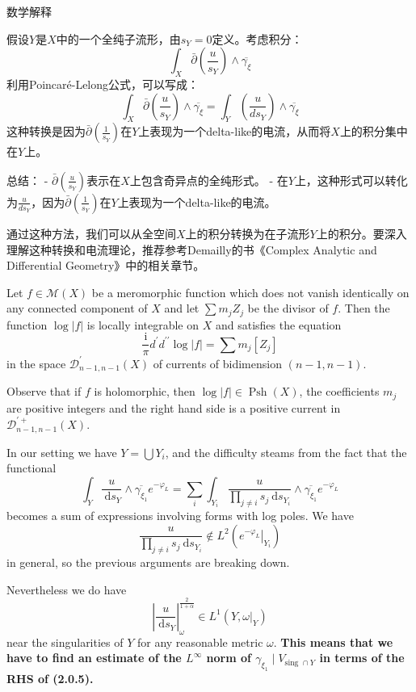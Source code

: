 \begin{remark}
数学解释

假设$Y$是$X$中的一个全纯子流形，由$s_Y=0$定义。考虑积分：
$$
\int_X \bar{\partial} \left( \frac{u}{s_Y} \right) \wedge \overline{\gamma_{\xi}}
$$
利用Poincaré-Lelong公式，可以写成：
$$
\int_X \bar{\partial} \left( \frac{u}{s_Y} \right) \wedge \overline{\gamma_{\xi}} = \int_Y \left( \frac{u}{ds_Y} \right) \wedge \overline{\gamma_{\xi}}
$$
这种转换是因为$\bar{\partial} \left( \frac{1}{s_Y} \right)$在$Y$上表现为一个delta-like的电流，从而将$X$上的积分集中在$Y$上。

总结：
- $\bar{\partial}\left(\frac{u}{s_Y}\right)$表示在$X$上包含奇异点的全纯形式。
- 在$Y$上，这种形式可以转化为$\frac{u}{ds_Y}$，因为$\bar{\partial}\left(\frac{1}{s_Y}\right)$在$Y$上表现为一个delta-like的电流。

通过这种方法，我们可以从全空间$X$上的积分转换为在子流形$Y$上的积分。要深入理解这种转换和电流理论，推荐参考Demailly的书《Complex Analytic and Differential Geometry》中的相关章节。
\end{remark}

\begin{thm}\label{thm:plelong} %
    Let $f \in \mathcal{M}(X)$ be a meromorphic function which does not vanish identically on any connected component of $X$ and let $\sum m_j Z_j$ be the divisor of $f$. Then the function $\log |f|$ is locally integrable on $X$ and satisfies the equation
$$
\frac{\mathrm{i}}{\pi} d^{\prime} d^{\prime \prime} \log |f|=\sum m_j\left[Z_j\right]
$$
in the space $\mathscr{D}_{n-1, n-1}^{\prime}(X)$ of currents of bidimension $(n-1, n-1)$.
\end{thm}
Observe that if $f$ is holomorphic, then $\log |f| \in \operatorname{Psh}(X)$, the coefficients $m_j$ are positive integers and the right hand side is a positive current in $\mathscr{D}_{n-1, n-1}^{\prime+}(X)$.


In our setting we have $Y=\bigcup Y_i$, and the difficulty steams from the fact that the functional
$$
\int_Y \frac{u}{\mathrm{~d} s_Y} \wedge \overline{\gamma_{\xi_1}} e^{-\varphi_L}=\sum_i \int_{Y_i} \frac{u}{\prod_{j \neq i} s_j \mathrm{~d} s_{Y_i}} \wedge \overline{\gamma_{\xi_1}} e^{-\varphi_L}
$$
becomes a sum of expressions involving forms with log poles. We have
$$
\frac{u}{\prod_{j \neq i} s_j \mathrm{~d} s_{Y_i}} \notin L^2\left(\left.e^{-\varphi_L}\right|_{Y_i}\right)
$$
in general, so the previous arguments are breaking down.
\begin{problem}[Why?]
Nevertheless we do have
$$
\left|\frac{u}{\mathrm{~d} s_Y}\right|_\omega^{\frac{2}{1+\alpha}} \in L^1\left(Y,\left.\omega\right|_Y\right)
$$
near the singularities of $Y$ for any reasonable metric $\omega$. \textbf{This means that we have to find an estimate of the $L^{\infty}$ norm of $\gamma_{\xi_1} \mid V_{\text {sing } \cap Y}$ in terms of the RHS of (2.0.5).}
\end{problem}

